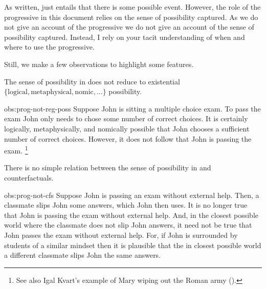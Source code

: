 \begin{note}
  As written, \assuPP{} just entails that there is some possible event.
  However, the role of the progressive in this document relies on the sense of possibility captured.
  As we do not give an account of the progressive we do not give an account of the sense of possibility captured.
  Instead, I rely on your tacit understanding of when and where to use the progressive.

  Still, we make a few observations to highlight some features.

  \begin{observation}%
    \label{obs:prog-not-reg-poss}%
    The sense of possibility in \assuPP{} does not reduce to existential \(\{\text{logical}, \text{metaphysical}, \text{nomic}, \dots\}\) possibility.
  \end{observation}
  \begin{motivation}{obs:prog-not-reg-poss}
    Suppose John is sitting a multiple choice exam.
    To pass the exam John only needs to chose some number of correct choices.
    It is certainly logically, metaphysically, and nomically possible that John chooses a sufficient number of correct choices.
    However, it does not follow that John is passing the exam.%
    \footnote{
      See also Igal Kvart's example of Mary wiping out the Roman army (\cite[18]{Landman:1992wh}).
    }
  \end{motivation}

  \begin{observation}%
    \label{obs:prog-not-cfs}%
    There is no simple relation between the sense of possibility in \assuPP{} and counterfactuals.
  \end{observation}
  \begin{motivation}{obs:prog-not-cfs}
    Suppose John is passing an exam without external help.
    Then, a classmate slips John some answers, which John then uses.
    It is no longer true that John is passing the exam without external help.
    And, in the closest possible world where the classmate does not slip John answers, it need not be true that John passes the exam without external help.
    For, if John is surrounded by students of a similar mindset then it is plausible that the in closest possible world a different classmate slips John the same answers.
  \end{motivation}


\end{note}
